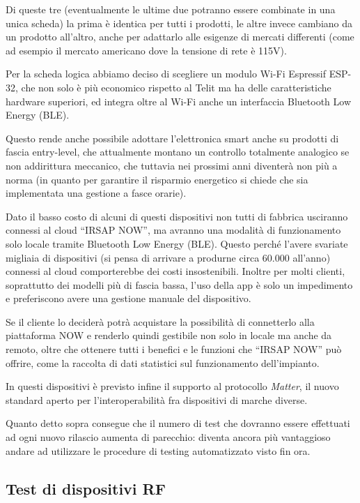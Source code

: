 \documentclass[12pt,a4paper,twoside,titlepage]{book}
\begin{document}
Di queste tre (eventualmente le ultime due potranno essere combinate in una
unica scheda) la prima è identica per tutti i prodotti, le altre invece cambiano
da un prodotto all'altro, anche per adattarlo alle esigenze di mercati differenti
(come ad esempio il mercato americano dove la tensione di rete è 115V).

Per la scheda logica abbiamo deciso di scegliere un modulo Wi-Fi Espressif
ESP-32, che non solo è più economico rispetto al Telit ma ha delle caratteristiche
hardware superiori, ed integra oltre al Wi-Fi anche un interfaccia Bluetooth Low Energy (BLE).

Questo rende anche possibile adottare l'elettronica smart anche su prodotti di
fascia entry-level, che attualmente montano un controllo totalmente analogico se non
addirittura meccanico, che tuttavia nei prossimi anni diventerà non più a norma (in
quanto per garantire il risparmio energetico si chiede che sia implementata una gestione
a fasce orarie).

Dato il basso costo di alcuni di questi dispositivi non tutti di fabbrica usciranno
connessi al cloud ``IRSAP NOW'', ma avranno una modalità di funzionamento solo locale
tramite Bluetooth Low Energy (BLE). Questo perché l'avere svariate migliaia di dispositivi
(si pensa di arrivare a produrne circa 60.000 all'anno) connessi al cloud comporterebbe
dei costi insostenibili. Inoltre per molti clienti, soprattutto dei modelli più di
fascia bassa, l'uso della app è solo un impedimento e preferiscono avere una gestione
manuale del dispositivo.

Se il cliente lo deciderà potrà acquistare la possibilità di connetterlo alla piattaforma
NOW e renderlo quindi gestibile non solo in locale ma anche da remoto, oltre che
ottenere tutti i benefici e le funzioni che ``IRSAP NOW'' può offrire, come la
raccolta di dati statistici sul funzionamento dell'impianto.

In questi dispositivi è previsto infine il supporto al protocollo \textit{Matter},
il nuovo standard aperto per l'interoperabilità fra dispositivi di marche diverse.

Quanto detto sopra consegue che il numero di test che dovranno essere effettuati ad
ogni nuovo rilascio aumenta di parecchio: diventa ancora più vantaggioso andare ad
utilizzare le procedure di testing automatizzato visto fin ora.

\subsection{Test di dispositivi RF}
\end{document}
